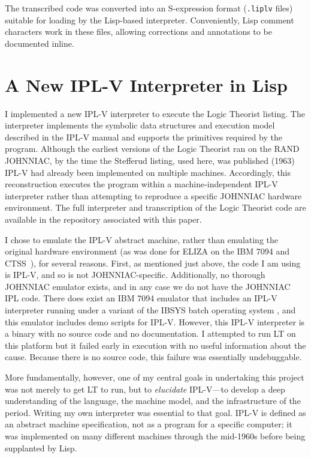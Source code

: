 \documentclass[journal]{IEEEtran}
\begin{document}
The transcribed code was converted into an S-expression format
(\texttt{.liplv} files) suitable for loading by the Lisp-based
interpreter. Conveniently, Lisp comment characters work in these
files, allowing corrections and annotations to be documented inline.

\section{A New IPL-V Interpreter in Lisp}
\label{sec:interpreter}

I implemented a new IPL-V interpreter to execute the Logic Theorist
listing. The interpreter implements the symbolic data structures and
execution model described in the IPL-V manual and supports the
primitives required by the program. Although the earliest versions of
the Logic Theorist ran on the RAND JOHNNIAC, by the time the Stefferud
listing, used here, was published (1963) IPL-V had already been
implemented on multiple machines. Accordingly, this reconstruction
executes the program within a machine-independent IPL-V interpreter
rather than attempting to reproduce a specific JOHNNIAC hardware
environment. The full interpreter and transcription of the Logic
Theorist code are available in the repository associated with this
paper.

I chose to emulate the IPL-V abstract machine, rather than emulating
the original hardware environment (as was done for ELIZA on the IBM
7094 and CTSS~\cite{lane2025eliza}), for several reasons. First, as
mentioned just above, the code I am using is IPL-V, and so is not
JOHNNIAC-specific. Additionally, no thorough JOHNNIAC emulator exists,
and in any case we do not have the JOHNNIAC IPL code. There does exist
an IBM 7094 emulator that includes an IPL-V interpreter running under
a variant of the IBSYS batch operating system \cite{ibsys}, and this
emulator includes demo scripts for IPL-V. However, this IPL-V
interpreter is a binary with no source code and no documentation. I
attempted to run LT on this platform but it failed early in execution
with no useful information about the cause. Because there is no source
code, this failure was essentially undebuggable.

More fundamentally, however, one of my central goals in undertaking
this project was not merely to get LT to run, but to
\textit{elucidate} IPL-V---to develop a deep understanding of the
language, the machine model, and the infrastructure of the
period. Writing my own interpreter was essential to that goal. IPL-V
is defined as an abstract machine specification, not as a program for
a specific computer; it was implemented on many different machines
through the mid-1960s before being supplanted by Lisp.
\end{document}
